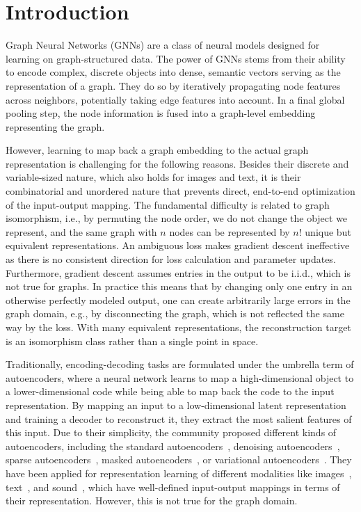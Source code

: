 \section{Introduction}\label{sec:introduction}
Graph Neural Networks (GNNs) are a class of neural models designed for learning on graph-structured data.
The power of GNNs stems from their ability to encode complex, discrete objects
into dense, semantic vectors serving as the representation of a graph.
They do so by iteratively propagating node features across neighbors, potentially taking
edge features into account.
In a final global pooling step, the node information is fused into a graph-level embedding
representing the graph.

However, learning to map back a graph embedding to the actual graph representation is challenging for the following reasons.
Besides their discrete and variable-sized nature, which also holds for images and text, it is their combinatorial
and unordered nature that prevents direct, end-to-end optimization of the input-output mapping.
The fundamental difficulty is related to graph isomorphism, i.e., by permuting the node order, we do not
change the object we represent, and the same graph with $n$ nodes can be represented by $n!$ unique but equivalent representations.
An ambiguous loss makes gradient descent ineffective as there is no consistent direction for loss calculation and parameter updates.
Furthermore, gradient descent assumes entries in the output to be i.i.d., which is not true for graphs.
In practice this means that by changing only one entry in an otherwise perfectly modeled output, one can create arbitrarily
large errors in the graph domain, e.g., by disconnecting the graph, which is not reflected the same way by the loss.
With many equivalent representations, the reconstruction target is an isomorphism class rather than a single point in space.

Traditionally, encoding-decoding tasks are formulated under the umbrella term of autoencoders, where a
neural network learns to map a high-dimensional object to a lower-dimensional code while being
able to map back the code to the input representation.
By mapping an input to a low-dimensional latent representation and training a decoder to reconstruct it,
they extract the most salient features of this input.
Due to their simplicity, the community proposed different kinds of autoencoders, including the standard
autoencoders~\cite{hinton2006autoencoder}, denoising autoencoders~\cite{vincent2008dae}, sparse autoencoders~\cite{ng2011sparseae},
masked autoencoders~\cite{he2022mae}, or variational autoencoders~\cite{vaes}.
They have been applied for representation learning of different modalities like
images~\cite{hinton2006autoencoder,vincent2008dae}, text~\cite{bowman2016generating}, and sound~\cite{zeghidour2021soundstream},
which have well-defined input-output mappings in terms of their representation.
However, this is not true for the graph domain.

